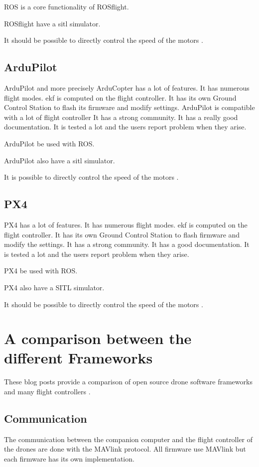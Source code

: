 ROS is a core functionality of ROSflight.

ROSflight have a \gls{sitl} simulator.

It should be possible to directly control the speed of the motors \cite{github_rosflight_98}.

\subsection{ArduPilot}
ArduPilot and more precisely ArduCopter has a lot of features.
It has numerous flight modes.
\Gls{ekf} is computed on the flight controller.
It has its own Ground Control Station to flash its firmware and modify settings.
ArduPilot is compatible with a lot of flight controller
It has a strong community.
It has a really good documentation.
It is tested a lot and the users report problem when they arise.

ArduPilot be used  with ROS.

ArduPilot also have a \gls{sitl} simulator.

It is possible to directly control the speed of the motors \cite{github_ardupilot_11859}.

\subsection{PX4}
PX4 has a lot of features.
It has numerous flight modes.
\Gls{ekf} is computed on the flight controller.
It has its own Ground Control Station to flash firmware and modify the settings.
It has a strong community.
It has a good documentation.
It is tested a lot and the users report problem when they arise.

PX4 be used  with ROS.

PX4 also have a SITL simulator.

It should be possible to directly control the speed of the motors \cite{px4_low_level_control}.

\section{A comparison between the different Frameworks}
These blog posts provide a comparison of open source drone software frameworks \cite{drone_software_projects} and many flight controllers \cite{drone_flight_controllers}.

\subsection{Communication}
The communication between the companion computer and the flight controller of the drones are done with the MAVlink protocol. All firmware use MAVlink but each firmware has its own implementation.


